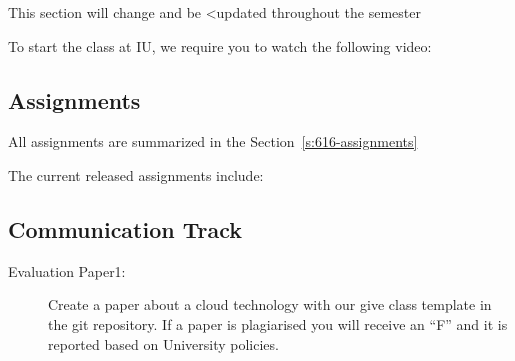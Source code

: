 \begin{WARNING}
This section will change and be <updated throughout the semester
\end{WARNING}

\begin{IU}

To start the class at IU, we require you to watch the following video:



\end{IU}

\subsection{Assignments}

All assignments are summarized in the Section~\ref{s:616-assignments}

The current released assignments include:


\subsection{Communication Track}




\begin{description}
\item[Evaluation Paper1:] Create a paper about a cloud technology with
  our give class template in the git repository. If a paper is
  plagiarised you will receive an ``F'' and it is reported based on
  University policies.
\end{description}


